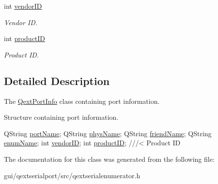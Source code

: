 \begin{DoxyCompactItemize}
\mbox{\label{structQextPortInfo_a41e550f44b17021fbdd0ea3f2e896fcc}} 
int \hyperlink{structQextPortInfo_a41e550f44b17021fbdd0ea3f2e896fcc}{vendor\+ID}
\begin{DoxyCompactList}\small\item\em Vendor ID. \end{DoxyCompactList}\item 
\mbox{\label{structQextPortInfo_aff45380c6ad0250cfd8628032f45e948}} 
int \hyperlink{structQextPortInfo_aff45380c6ad0250cfd8628032f45e948}{product\+ID}
\begin{DoxyCompactList}\small\item\em Product ID. \end{DoxyCompactList}\end{DoxyCompactItemize}


\subsection{Detailed Description}
The \hyperlink{structQextPortInfo}{Qext\+Port\+Info} class containing port information. 

Structure containing port information.


\begin{DoxyCode}
QString \hyperlink{structQextPortInfo_ab28ecc59f84babdf486ab5fad74e024a}{portName};   
QString \hyperlink{structQextPortInfo_a9bb0593dbd5bc1a0fc081e61268eaf46}{physName};   
QString \hyperlink{structQextPortInfo_a1bf41f0d6c577f87161f4fdb077fb952}{friendName}; 
QString \hyperlink{structQextPortInfo_a47a6287c969ce9797b87f9ffdf36763c}{enumName};   
\textcolor{keywordtype}{int} \hyperlink{structQextPortInfo_a41e550f44b17021fbdd0ea3f2e896fcc}{vendorID};       
\textcolor{keywordtype}{int} \hyperlink{structQextPortInfo_aff45380c6ad0250cfd8628032f45e948}{productID};      \textcolor{comment}{///< Product ID}
\end{DoxyCode}
 

The documentation for this class was generated from the following file\+:\begin{DoxyCompactItemize}
\item 
gui/qextserialport/src/qextserialenumerator.\+h\end{DoxyCompactItemize}
